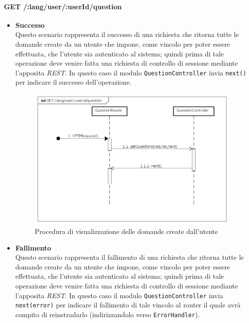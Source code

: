 
\paragraph{GET /:lang/user/:userId/question}
\begin{itemize}
\item \textbf{Successo}\\
Questo scenario rappresenta il successo di una richiesta che ritorna tutte le domande create da un utente che impone, come vincolo per poter essere effettuata, che l'utente sia autenticato al sistema; quindi prima di tale operazione deve venire fatta una richiesta di controllo di sessione mediante l'apposita \textit{REST}. In questo caso il modulo \texttt{QuestionController} invia \texttt{next()} per indicare il successo dell'operazione.

\begin{figure}[ht]
	\centering
	\includegraphics[scale=0.45]{UML/DiagrammiDiSequenza/Back-end/GET__lang_user__userId_question_success.png}
	\caption{Procedura di visualizzazione delle domande create dall'utente}
\end{figure}
\FloatBarrier

\item \textbf{Fallimento}\\
Questo scenario rappresenta il fallimento di una richiesta che ritorna tutte le domande create da un utente che impone, come vincolo per poter essere effettuata, che l'utente sia autenticato al sistema; quindi prima di tale operazione deve venire fatta una richiesta di controllo di sessione mediante l'apposita \textit{REST}. In questo caso il modulo \texttt{QuestionController} invia \texttt{next(error)} per indicare il fallimento di tale vincolo al router il quale avrà compito di reinstradarlo (indirizzandolo verso \texttt{ErrorHandler}).


\end{itemize}
